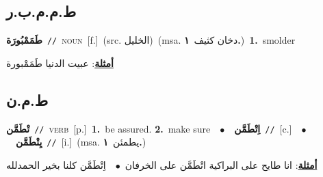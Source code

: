 \documentclass[10pt,a4paper,twoside]{article} %
\begin{document}
\begin{multicols}{2}
\vspace{-3mm}
\subsection*{\color{blue}\foreignlanguage{arabic}{ط.م.م.ب.ر}\color{blue}{ (ntws)}} 

{\setlength\topsep{0pt}\textbf{\foreignlanguage{arabic}{طَمَمْبُورَة}}\ {\color{gray}\texttt{//}\color{black}}\ \textsc{noun}\ [f.]\ (src. \color{gray}\foreignlanguage{arabic}{الخليل}\color{black})\ \color{gray}(msa. \foreignlanguage{arabic}{دخان كثيف}~\foreignlanguage{arabic}{\textbf{١.}})\color{black}\ \textbf{1.}~smolder\  \begin{flushright}\color{gray}\foreignlanguage{arabic}{\textbf{\underline{\foreignlanguage{arabic}{أمثلة}}}: عبيت الدنيا طَمَمْبورة}\end{flushright}\color{black}} \vspace{2mm}

\vspace{-3mm}
\subsection*{\color{blue}\foreignlanguage{arabic}{ط.م.ن}\color{blue}{}} 

{\setlength\topsep{0pt}\textbf{\foreignlanguage{arabic}{تْطَمَّن}}\ {\color{gray}\texttt{//}\color{black}}\ \textsc{verb}\ [p.]\ \textbf{1.}~be assured.  \textbf{2.}~make sure\ \ $\bullet$\ \ \setlength\topsep{0pt}\textbf{\foreignlanguage{arabic}{اِتْطَمَّن}}\ {\color{gray}\texttt{//}\color{black}}\ [c.]\ \ $\bullet$\ \ \setlength\topsep{0pt}\textbf{\foreignlanguage{arabic}{يِتْطَمَّن}}\ {\color{gray}\texttt{//}\color{black}}\ [i.]\ \color{gray}(msa. \foreignlanguage{arabic}{يطمئن}~\foreignlanguage{arabic}{\textbf{١.}})\color{black}\  \begin{flushright}\color{gray}\foreignlanguage{arabic}{\textbf{\underline{\foreignlanguage{arabic}{أمثلة}}}: انا طايح على البراكية اتْطَمَّن على الخرفان\ $\bullet$\ \  اِتْطَمَّن كلنا بخير الحمدلله}\end{flushright}\color{black}} \vspace{2mm}


\end{multicols}
\end{document}
